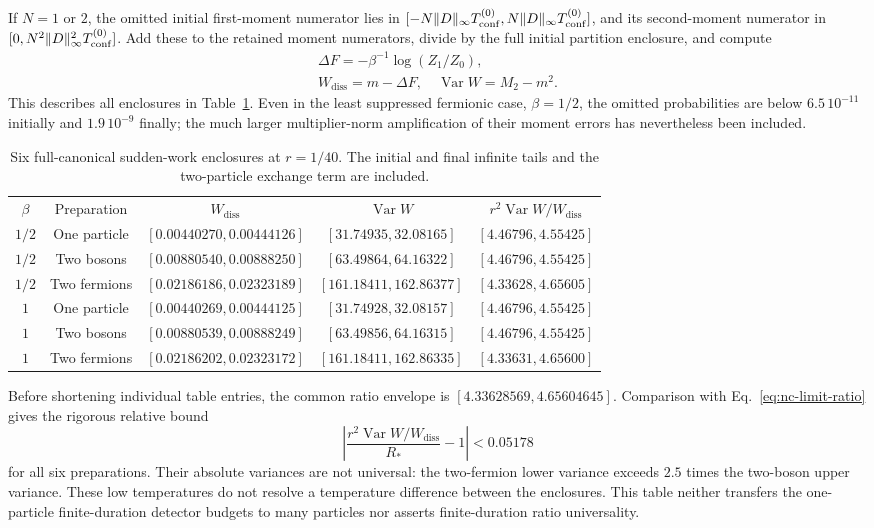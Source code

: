 \documentclass[aps,pra,reprint,superscriptaddress,longbibliography]{revtex4-2}
\newcommand{\Var}{\operatorname{Var}}
\newcommand{\Wd}{W_{\mathrm{diss}}}
\begin{document}
If $N=1$ or $2$, the omitted initial first-moment numerator lies in
$[-N\|D\|_\infty T_{\rm conf}^{(0)},
   N\|D\|_\infty T_{\rm conf}^{(0)}]$,
and its second-moment numerator in
$[0,N^2\|D\|_\infty^2T_{\rm conf}^{(0)}]$.
Add these to the retained moment numerators, divide by the full
initial partition enclosure, and compute
\begin{equation}
 \begin{gathered}
 \Delta F=-\beta^{-1}\log(Z_1/Z_0),\\
 \Wd=m-\Delta F,\quad
 \Var W=M_2-m^2.
 \end{gathered}
 \label{eq:nc-prep-normalize}
\end{equation}
This describes all enclosures in Table~\ref{tab:nc-preparations}.
Even in the least suppressed fermionic case, $\beta=1/2$, the
omitted probabilities are below $6.5\,10^{-11}$ initially and
$1.9\,10^{-9}$ finally; the much larger multiplier-norm amplification
of their moment errors has nevertheless been included.

\begin{table}[t]
\caption{Six full-canonical sudden-work enclosures at $r=1/40$.
The initial and final infinite tails and the two-particle exchange
term are included.}
\label{tab:nc-preparations}
\begin{ruledtabular}
\begin{tabular}{ccccc}
$\beta$&Preparation&$\Wd$&$\Var W$&$r^2\Var W/\Wd$\\
$1/2$&One particle&$[0.00440270,0.00444126]$&$[31.74935,32.08165]$&$[4.46796,4.55425]$\\
$1/2$&Two bosons&$[0.00880540,0.00888250]$&$[63.49864,64.16322]$&$[4.46796,4.55425]$\\
$1/2$&Two fermions&$[0.02186186,0.02323189]$&$[161.18411,162.86377]$&$[4.33628,4.65605]$\\
$1$&One particle&$[0.00440269,0.00444125]$&$[31.74928,32.08157]$&$[4.46796,4.55425]$\\
$1$&Two bosons&$[0.00880539,0.00888249]$&$[63.49856,64.16315]$&$[4.46796,4.55425]$\\
$1$&Two fermions&$[0.02186202,0.02323172]$&$[161.18411,162.86335]$&$[4.33631,4.65600]$
\end{tabular}
\end{ruledtabular}
\end{table}

Before shortening individual table entries, the common ratio envelope
is $[4.33628569,4.65604645]$.  Comparison with
Eq.~\eqref{eq:nc-limit-ratio} gives the rigorous relative bound
\begin{equation}
 \left|\frac{r^2\Var W/\Wd}{R_*}-1\right|<0.05178
 \label{eq:nc-common-error}
\end{equation}
for all six preparations.  Their absolute variances are not universal:
the two-fermion lower variance exceeds $2.5$ times the two-boson upper
variance.  These low temperatures do not resolve a temperature
difference between the enclosures.  This table neither transfers the
one-particle finite-duration detector budgets to many particles nor
asserts finite-duration ratio universality.
\end{document}
